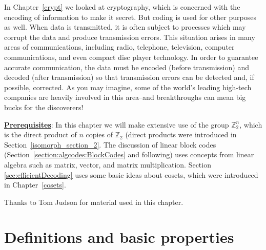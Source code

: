  
In Chapter~\ref{crypt} we looked at  cryptography, which is concerned with the encoding of  information to make it secret. But coding is used for other purposes as well.  When data is transmitted, it is often subject to processes which may corrupt the data and produce transmission errors. This situation
arises in many areas of communications, including radio, telephone, television, computer communications, and even compact disc player technology. In order to guarantee accurate communication, the data must be encoded (before transmission) and decoded (after transmission) so that transmission errors can be detected and, if possible, corrected. As you may imagine,  some of the world's leading high-tech companies are heavily involved in this area--and breakthroughs can mean big bucks for the discoverers!
\medskip

\noindent
\underline{\bf Prerequisites}: In this chapter we will make extensive use of the group $\mathbb{Z}^{n}_{2}$, which is the direct product of $n$ copies of $\mathbb{Z}_{2}$ (direct products were introduced in Section~\ref{isomorph_section_2}.  
The discussion of linear block codes (Section~\ref{section:algcodes:BlockCodes} and following) uses concepts from linear algebra such as matrix, vector, and matrix multiplication. Section \ref{sec:efficientDecoding} uses some basic ideas about cosets, which were introduced in  Chapter~\ref{cosets}.  
\bigskip

Thanks to Tom Judson for material used in this chapter.
  
 
\section{Definitions and basic properties}\label{section:algcodes:1}
  

